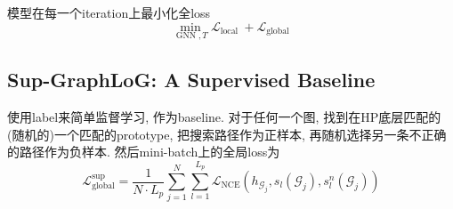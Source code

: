 \documentclass{article}
\begin{document}
模型在每一个iteration上最小化全loss
\begin{equation}
    \min _{\operatorname{GNN}, T} \mathcal{L}_{\text {local }}+\mathcal{L}_{\text {global }}
\end{equation}

\subsection{Sup-GraphLoG: A Supervised Baseline}

使用label来简单监督学习, 作为baseline. 对于任何一个图, 找到在HP底层匹配的(随机的)一个匹配的prototype, 把搜索路径作为正样本, 再随机选择另一条不正确的路径作为负样本. 然后mini-batch上的全局loss为
\begin{equation}
    \mathcal{L}_{\mathrm{global}}^{\mathrm{sup}}=\frac{1}{N \cdot L_{p}} \sum_{j=1}^{N} \sum_{l=1}^{L_{p}} \mathcal{L}_{\mathrm{NCE}}\left(h_{\mathcal{G}_{j}}, s_{l}\left(\mathcal{G}_{j}\right), s_{l}^{n}\left(\mathcal{G}_{j}\right)\right)
\end{equation}
\end{document}
